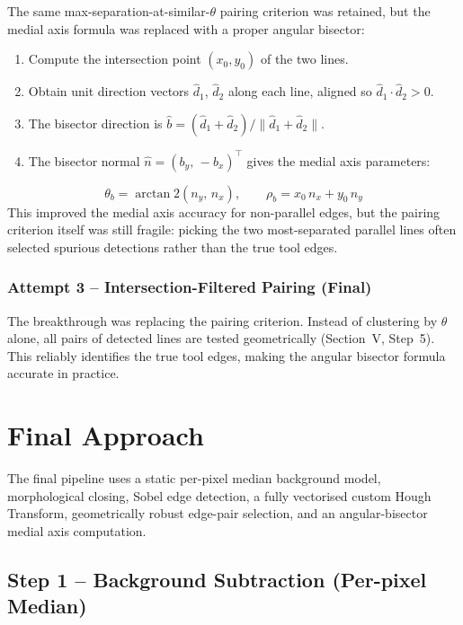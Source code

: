 \documentclass[conference, twocolumn]{IEEEtran}
\begin{document}
The same max-separation-at-similar-$\theta$ pairing criterion was retained, but the medial axis formula was replaced with a proper angular bisector:
\begin{enumerate}
    \item Compute the intersection point $(x_0, y_0)$ of the two lines.
    \item Obtain unit direction vectors $\hat{d}_1$, $\hat{d}_2$ along each line, aligned so $\hat{d}_1 \cdot \hat{d}_2 > 0$.
    \item The bisector direction is $\hat{b} = (\hat{d}_1 + \hat{d}_2) / \|\hat{d}_1 + \hat{d}_2\|$.
    \item The bisector normal $\hat{n} = (b_y,\, -b_x)^\top$ gives the medial axis parameters:
\end{enumerate}
\begin{equation}
    \theta_b = \arctan2(n_y,\, n_x), \qquad \rho_b = x_0\, n_x + y_0\, n_y
\end{equation}
This improved the medial axis accuracy for non-parallel edges, but the pairing criterion itself was still fragile: picking the two most-separated parallel lines often selected spurious detections rather than the true tool edges.

\subsubsection{Attempt 3 -- Intersection-Filtered Pairing (Final)}

The breakthrough was replacing the pairing criterion. Instead of clustering by $\theta$ alone, all pairs of detected lines are tested geometrically (Section~V, Step~5). This reliably identifies the true tool edges, making the angular bisector formula accurate in practice.

\section{Final Approach}

The final pipeline uses a static per-pixel median background model, morphological closing, Sobel edge detection, a fully vectorised custom Hough Transform, geometrically robust edge-pair selection, and an angular-bisector medial axis computation.

\subsection{Step 1 -- Background Subtraction (Per-pixel Median)}
\end{document}
